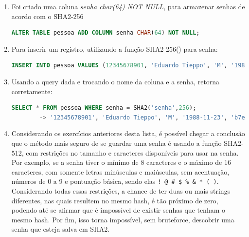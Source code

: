 \documentclass{article}
\begin{document}
\begin{enumerate}[label=\alph*)]
    \item Foi criado uma coluna \textit{senha char(64) NOT NULL}, para armazenar senhas de acordo com o SHA2-256
    \begin{lstlisting}[language=SQL]
        ALTER TABLE pessoa ADD COLUMN senha CHAR(64) NOT NULL;
    \end{lstlisting}
    
    \item Para inserir um registro, utilizando a função SHA2-256() para senha:

    \begin{lstlisting}[language=SQL]
        INSERT INTO pessoa VALUES (12345678901, 'Eduardo Tieppo', 'M', '1988-11-23', SHA2('senha', 256));
    \end{lstlisting}

    \item Usando a query dada e trocando o nome da coluna e a senha, retorna corretamente:

    \begin{lstlisting}[language=SQL]
        SELECT * FROM pessoa WHERE senha = SHA2('senha',256);
        -> '12345678901', 'Eduardo Tieppo', 'M', '1988-11-23', 'b7e94be513e96e8c45cd23d162275e5a12ebde9100a425c4ebcdd7fa4dcd897c'
    \end{lstlisting}

    \item Considerando os exercícios anteriores desta lista, é possível chegar a conclusão que o método mais seguro de se guardar uma senha é usando a função SHA2-512, com restrições no tamanho e caracteres disponíveis para usar na senha. Por exemplo, se a senha tiver o mínimo de 8 caracteres e o máximo de 16 caracteres, com somente letras minúsculas e maiúsculas, sem acentuação, números de 0 a 9 e pontuação básica, sendo elas \texttt{! @ \# \$ \% \& * ( )}. Considerando todas essas restrições, a chance de ter duas ou mais strings diferentes, nas quais resultem no mesmo hash, é tão próximo de zero, podendo até se afirmar que é impossível de existir senhas que tenham o mesmo hash. Por fim, isso torna impossível, sem bruteforce, descobrir uma senha que esteja salva em SHA2. 

\end{enumerate}
\end{document}
